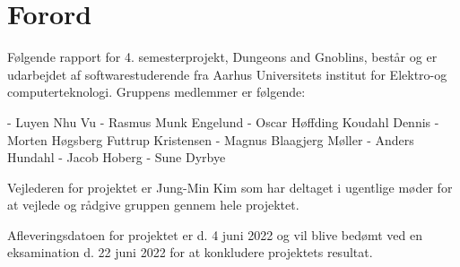 \section{Forord}
Følgende rapport for 4.  semesterprojekt, Dungeons and Gnoblins, består og er udarbejdet af softwarestuderende fra Aarhus Universitets institut for Elektro-og computerteknologi. Gruppens medlemmer er følgende:

- Luyen Nhu Vu
- Rasmus Munk Engelund
- Oscar Høffding Koudahl Dennis
- Morten Høgsberg Futtrup Kristensen
- Magnus Blaagjerg Møller
- Anders Hundahl
- Jacob Hoberg
- Sune Dyrbye

Vejlederen for projektet er Jung-Min Kim som har deltaget i ugentlige møder for at vejlede og rådgive gruppen gennem hele projektet.

Afleveringsdatoen for projektet er d. 4 juni 2022 og vil blive bedømt ved en eksamination d. 22 juni 2022 for at konkludere projektets resultat.